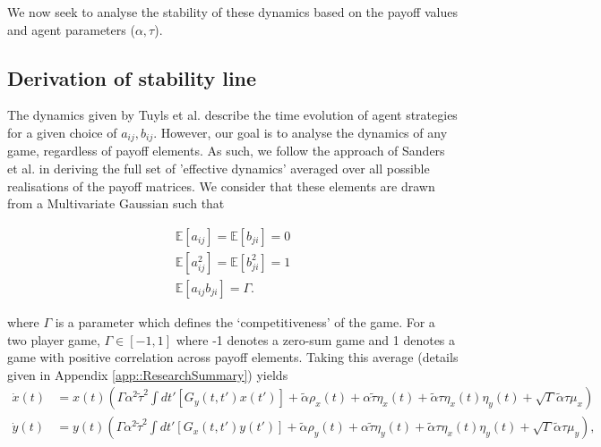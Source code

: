 \documentclass[.../main.tex]{subfiles}
\begin{document}
    We now seek to analyse the stability of these dynamics based on the payoff values and agent
    parameters ($\alpha, \tau$).

     \subsection{Derivation of stability line} %
     \label{sub:derivation_of_stability_line}
    

    The dynamics given by Tuyls et al. describe the time evolution of agent
    strategies for a given choice of $a_{ij}, b_{ij}$. However, our goal is to
    analyse the dynamics of any game, regardless of payoff elements. As such,
    we follow the approach of Sanders et al. in deriving the full set of
    'effective dynamics' averaged over all possible realisations of the payoff
    matrices. We consider that these elements are drawn from a Multivariate Gaussian
    such that

    \begin{equation*}
        \begin{split}
            \mathbb{E}[a_{ij}] = \mathbb{E}[b_{ji}] = 0\\
            \mathbb{E}[a_{ij}^2] = \mathbb{E}[b_{ji}^2] = 1\\
            \mathbb{E}[a_{ij} b_{ji}] = \Gamma.
        \end{split}
    \end{equation*}

    where $\Gamma$ is a parameter which defines the `competitiveness' of the game. For a two player
    game, $\Gamma \in [-1, 1]$ where -1 denotes a zero-sum game and 1 denotes a game with positive
    correlation across payoff elements. Taking this average (details given in Appendix 
    \ref{app::ResearchSummary}) yields
%
    \begin{equation}
    \begin{split}
        \dot{x}(t) &= x(t)(\Gamma \alpha^2 \tilde{\tau}^2 \int dt'[G_y(t, t')x(t')] + 
        \tilde{\alpha}
        \rho_x(t) + \alpha \tilde{\tau} \eta_x(t) + \tilde{\alpha} \tau \eta_x(t) \eta_y(t) +
        \sqrt{\Gamma} \tilde{\alpha} \tau \mu_x) \\
        \dot{y}(t) &= y(t)(\Gamma \alpha^2 \tilde{\tau}^2 \int dt'[G_x(t, t')y(t')] + 
        \tilde{\alpha} \rho_y(t) +
        \alpha \tilde{\tau} \eta_y(t) + \tilde{\alpha} \tau \eta_x(t) \eta_y(t)+ 
        \sqrt{\Gamma} \tilde{\alpha} \tau \mu_y), \\
    \end{split}
    \end{equation}
\end{document}

